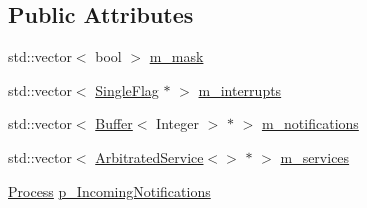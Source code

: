 \subsection*{Public Attributes}
\begin{DoxyCompactItemize}
\item 
std\+::vector$<$ bool $>$ \hyperlink{class_simulator_1_1drisc_1_1_i_o_notification_multiplexer_ad2a670520047a365153c3368612a89b4}{m\+\_\+mask}
\item 
std\+::vector$<$ \hyperlink{class_simulator_1_1_single_flag}{Single\+Flag} $\ast$ $>$ \hyperlink{class_simulator_1_1drisc_1_1_i_o_notification_multiplexer_a289de8e270f98af7cb3de8868373afe8}{m\+\_\+interrupts}
\item 
std\+::vector$<$ \hyperlink{class_simulator_1_1_buffer}{Buffer}$<$ Integer $>$ $\ast$ $>$ \hyperlink{class_simulator_1_1drisc_1_1_i_o_notification_multiplexer_a5084820b78186edca4fb291e39bb2b8f}{m\+\_\+notifications}
\item 
std\+::vector$<$ \hyperlink{class_simulator_1_1_arbitrated_service}{Arbitrated\+Service}$<$$>$ $\ast$ $>$ \hyperlink{class_simulator_1_1drisc_1_1_i_o_notification_multiplexer_a63e8745028e4e013786283ea963cb515}{m\+\_\+services}
\item 
\hyperlink{class_simulator_1_1_process}{Process} \hyperlink{class_simulator_1_1drisc_1_1_i_o_notification_multiplexer_acefe69eb8744c97868986edaa1c5ef2e}{p\+\_\+\+Incoming\+Notifications}
\end{DoxyCompactItemize}


